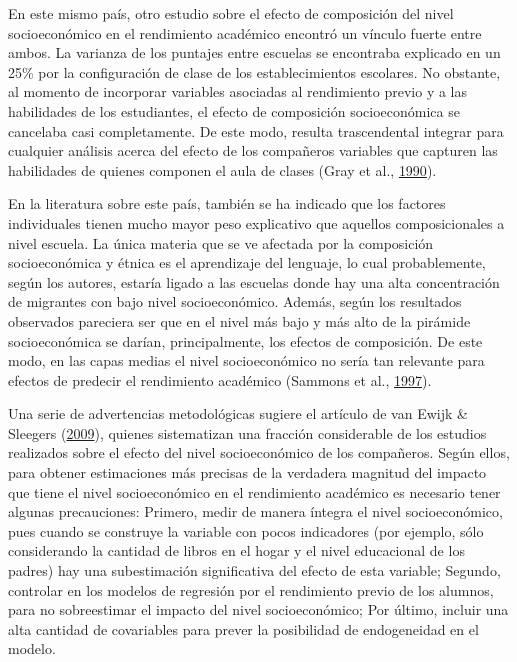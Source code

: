 \documentclass[
]{article}
\begin{document}
En este mismo país, otro estudio sobre el efecto de composición del
nivel socioeconómico en el rendimiento académico encontró un vínculo
fuerte entre ambos. La varianza de los puntajes entre escuelas se
encontraba explicado en un 25\% por la configuración de clase de los
establecimientos escolares. No obstante, al momento de incorporar
variables asociadas al rendimiento previo y a las habilidades de los
estudiantes, el efecto de composición socioeconómica se cancelaba casi
completamente. De este modo, resulta trascendental integrar para
cualquier análisis acerca del efecto de los compañeros variables que
capturen las habilidades de quienes componen el aula de clases (Gray et
al., \protect\hyperlink{ref-gray_estimating_1990}{1990}).

En la literatura sobre este país, también se ha indicado que los
factores individuales tienen mucho mayor peso explicativo que aquellos
composicionales a nivel escuela. La única materia que se ve afectada por
la composición socioeconómica y étnica es el aprendizaje del lenguaje,
lo cual probablemente, según los autores, estaría ligado a las escuelas
donde hay una alta concentración de migrantes con bajo nivel
socioeconómico. Además, según los resultados observados pareciera ser
que en el nivel más bajo y más alto de la pirámide socioeconómica se
darían, principalmente, los efectos de composición. De este modo, en las
capas medias el nivel socioeconómico no sería tan relevante para efectos
de predecir el rendimiento académico (Sammons et al.,
\protect\hyperlink{ref-sammons_forging_1997}{1997}).

Una serie de advertencias metodológicas sugiere el artículo de van Ewijk
\& Sleegers (\protect\hyperlink{ref-vanewijk_effect_2009}{2009}),
quienes sistematizan una fracción considerable de los estudios
realizados sobre el efecto del nivel socioeconómico de los compañeros.
Según ellos, para obtener estimaciones más precisas de la verdadera
magnitud del impacto que tiene el nivel socioeconómico en el rendimiento
académico es necesario tener algunas precauciones: Primero, medir de
manera íntegra el nivel socioeconómico, pues cuando se construye la
variable con pocos indicadores (por ejemplo, sólo considerando la
cantidad de libros en el hogar y el nivel educacional de los padres) hay
una subestimación significativa del efecto de esta variable; Segundo,
controlar en los modelos de regresión por el rendimiento previo de los
alumnos, para no sobreestimar el impacto del nivel socioeconómico; Por
último, incluir una alta cantidad de covariables para prever la
posibilidad de endogeneidad en el modelo.
\end{document}
